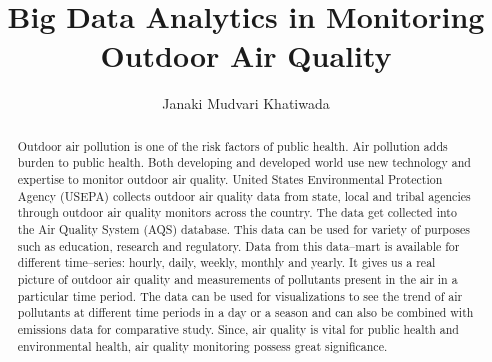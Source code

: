 \documentclass[sigconf]{acmart}
\begin{document}
\title{Big Data Analytics in Monitoring  Outdoor Air Quality}


\author{Janaki Mudvari Khatiwada}






\begin{abstract}
Outdoor air pollution is one of the risk factors of public health. Air pollution adds burden to public health. Both developing and developed world use new technology and expertise to monitor outdoor air quality. 
United States Environmental Protection Agency (USEPA) collects outdoor air quality data from state, local 
and tribal agencies through outdoor air quality monitors across the country. The data get collected into the Air 
Quality System (AQS) database. This data can be used for variety of purposes such as education, research
and regulatory. Data from this data--mart is available for different time--series: hourly, daily, weekly, monthly 
and yearly. It gives us a real picture of outdoor air quality and measurements of pollutants present in the air in 
a particular time period. The data can be used for visualizations to see the trend of air pollutants at different time periods in a day or a season  and can also be combined with emissions data for comparative study. Since, air quality is vital for public health and 
environmental health, air quality monitoring possess great significance.


\end{abstract}



\maketitle
\end{document}
